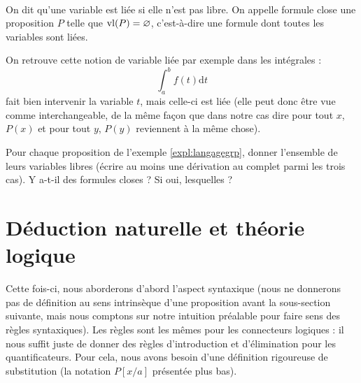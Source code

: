 \begin{defi}
\begin{itemize}[label=$\bullet$]
\begin{center}
\begin{prooftree}
            \end{prooftree}
            \\
            \vspace{0.5cm}
            \begin{prooftree}
            \end{prooftree}
            \quad
            \begin{prooftree}
            \end{prooftree}
        \end{center}
    \end{itemize}

    On dit qu'une variable est liée si elle n'est pas libre.
    On appelle formule close une proposition $P$ telle que $\varlib{P} = \varnothing$, c'est-à-dire une formule dont toutes les variables sont liées.
\end{defi}

\begin{rmk}
    On retrouve cette notion de variable liée par exemple dans les intégrales : $$\int_a^b f(t)\mathrm dt$$ fait bien intervenir la variable $t$, mais celle-ci est liée (elle peut donc être vue comme interchangeable, de la même façon que dans notre cas dire \og pour tout $x$, $P(x)$\fg{} et \og pour tout $y$, $P(y)$\fg{} reviennent à la même chose).
\end{rmk}

\begin{exo}
    Pour chaque proposition de l'exemple \ref{expl:langagegrp}, donner l'ensemble de leurs variables libres (écrire au moins une dérivation au complet parmi les trois cas). Y a-t-il des formules closes ? Si oui, lesquelles ?
\end{exo}

\section{Déduction naturelle et théorie logique}

Cette fois-ci, nous aborderons d'abord l'aspect syntaxique (nous ne donnerons pas de définition au sens intrinsèque d'une proposition avant la sous-section suivante, mais nous comptons sur notre intuition préalable pour faire sens des règles syntaxiques). Les règles sont les mêmes pour les connecteurs logiques : il nous suffit juste de donner des règles d'introduction et d'élimination pour les quantificateurs. Pour cela, nous avons besoin d'une définition rigoureuse de substitution (la notation $P[x/a]$ présentée plus bas).


